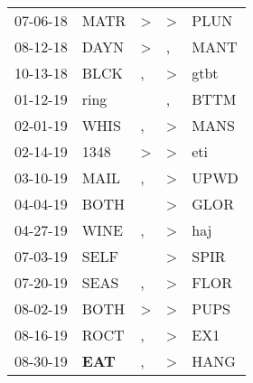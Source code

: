 \begin{supertabular}{p{0.07\textwidth}p{0.06\textwidth}p{0.02\textwidth}p{0.02\textwidth}p{0.06\textwidth}}
          07-06-18\textsuperscript{} &           MATR\textsuperscript{} &     \textgreater &     \textgreater &           PLUN\textsuperscript{} \\
          08-12-18\textsuperscript{} &           DAYN\textsuperscript{} &     \textgreater &                , &           MANT\textsuperscript{} \\
          10-13-18\textsuperscript{} &           BLCK\textsuperscript{} &                , &     \textgreater &           gtbt\textsuperscript{} \\
          01-12-19\textsuperscript{} &           ring\textsuperscript{} &                  &                , &           BTTM\textsuperscript{} \\
          02-01-19\textsuperscript{} &           WHIS\textsuperscript{} &                , &     \textgreater &           MANS\textsuperscript{} \\
          02-14-19\textsuperscript{} &           1348\textsuperscript{} &     \textgreater &     \textgreater &            eti\textsuperscript{} \\
          03-10-19\textsuperscript{} &           MAIL\textsuperscript{} &                , &     \textgreater &           UPWD\textsuperscript{} \\
          04-04-19\textsuperscript{} &           BOTH\textsuperscript{} &                  &     \textgreater &           GLOR\textsuperscript{} \\
          04-27-19\textsuperscript{} &           WINE\textsuperscript{} &                , &     \textgreater &            haj\textsuperscript{} \\
          07-03-19\textsuperscript{} &           SELF\textsuperscript{} &                  &     \textgreater &           SPIR\textsuperscript{} \\
          07-20-19\textsuperscript{} &           SEAS\textsuperscript{} &                , &     \textgreater &           FLOR\textsuperscript{} \\
          08-02-19\textsuperscript{} &           BOTH\textsuperscript{} &     \textgreater &     \textgreater &           PUPS\textsuperscript{} \\
          08-16-19\textsuperscript{} &           ROCT\textsuperscript{} &                , &     \textgreater &            EX1\textsuperscript{} \\
          08-30-19\textsuperscript{} &   \textbf{EAT\textsuperscript{}} &                , &     \textgreater &           HANG\textsuperscript{} \\

\end{supertabular}
